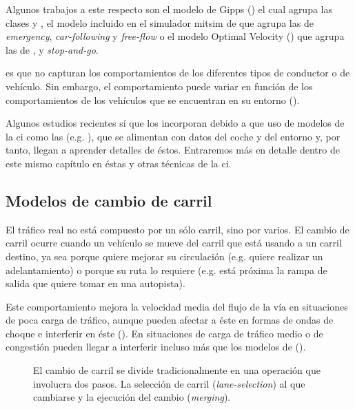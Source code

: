 Algunos trabajos a este respecto son el modelo de Gipps (\cite{Gipps1981}) el cual agrupa las clases \textit{} y \textit{}, el modelo incluido en el simulador \gls{mitsim} de \cite{Yang1996} que agrupa las de \textit{emergency}, \textit{car-following} y \textit{free-flow} o el modelo Optimal Velocity (\cite{Bando1998}) que agrupa las de \textit{}, \textit{} y \textit{stop-and-go}.

 es que no capturan los comportamientos de los diferentes tipos de conductor o de vehículo. Sin embargo, el comportamiento puede variar en función de los comportamientos de los vehículos que se encuentran en su entorno (\cite{Tordeux2010}).

Algunos estudios recientes sí que los incorporan debido a que uso de modelos de la \gls{ci} como las  (e.g. \cite{Simonelli2009, Fusco2013}), que se alimentan con datos del coche y del entorno y, por tanto, llegan a aprender detalles de éstos. Entraremos más en detalle dentro de este mismo capítulo en éstas y otras técnicas de la \gls{ci}.

\subsection{Modelos de cambio de carril}

El tráfico real no está compuesto por un sólo carril, sino por varios. El cambio de carril ocurre cuando un vehículo se mueve del carril que está usando a un carril destino, ya sea porque quiere mejorar su circulación (e.g. quiere realizar un adelantamiento) o porque su ruta lo requiere (e.g. está próxima la rampa de salida que quiere tomar en una autopista).

Este comportamiento mejora la velocidad media del flujo de la vía en situaciones de poca carga de tráfico, aunque pueden afectar a éste en formas de ondas de choque e interferir en éste (\cite{Sasoh2002, Jin2006}). En situaciones de carga de tráfico medio o de congestión pueden llegar a interferir incluso más que los modelos de \textit{} (\cite{Laval2006}).

\begin{figure}
	\caption{El cambio de carril se divide tradicionalmente en una operación que involucra dos pasos. La selección de carril (\textit{lane-selection}) al que cambiarse y la ejecución del cambio (\textit{merging}).}
	\label{fig:lane-selection-plus-merging}
\end{figure}

